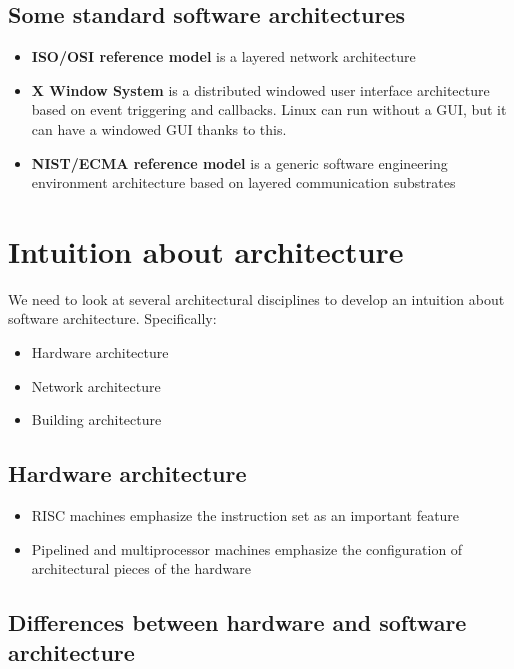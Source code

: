 \documentclass[12pt]{book}
\begin{document}
\subsection{Some standard software architectures}

\begin{itemize}
    \item \textbf{ISO/OSI reference model} is a layered network architecture
    \item \textbf{X Window System} is a distributed windowed user interface architecture based on event triggering and callbacks. Linux can run without a GUI, but it can have a windowed GUI thanks to this.
    \item \textbf{NIST/ECMA reference model} is a generic software engineering environment architecture based on layered communication substrates
\end{itemize}

\section{Intuition about architecture}

We need to look at several architectural disciplines to develop an intuition about software architecture. Specifically:

\begin{itemize}
    \item Hardware architecture
    \item Network architecture
    \item Building architecture
\end{itemize}

\subsection{Hardware architecture}

\begin{itemize}
    \item RISC machines emphasize the instruction set as an important feature
    \item Pipelined and multiprocessor machines emphasize the configuration of architectural pieces of the hardware
\end{itemize}

\subsection{Differences between hardware and software architecture}
\end{document}
